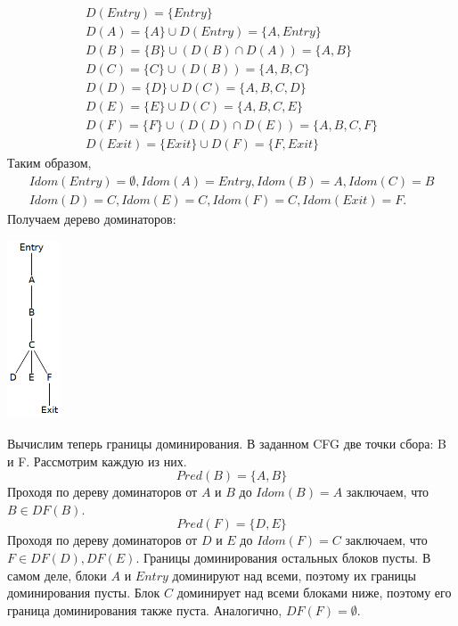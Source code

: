 \documentclass[11pt]{article}
\begin{document}
\begin{gather*}
D(Entry) = \{Entry\} \\
D(A) = \{A\} \cup D(Entry) = \{A, Entry\} \\
D(B) = \{B\} \cup (D(B) \cap D(A)) = \{A, B\} \\
D(C) = \{C\} \cup (D(B)) = \{A, B, C\} \\
D(D) = \{D\} \cup D(C) = \{A, B, C, D\} \\
D(E) = \{E\} \cup D(C) = \{A, B, C, E\} \\
D(F) = \{F\} \cup (D(D) \cap D(E)) = \{A, B, C, F\} \\
D(Exit) = \{Exit\} \cup D(F) = \{F, Exit\}
\end{gather*}
Таким образом,
\begin{gather*}
Idom(Entry) = \emptyset, Idom(A) = Entry, Idom(B) = A, Idom(C) = B \\
Idom(D) = C, Idom(E) = C, Idom(F) = C, Idom(Exit) = F.
\end{gather*}
Получаем дерево доминаторов:
\begin{center}
\includegraphics[height=200px]{dom-tree2.png}
\end{center}

Вычислим теперь границы доминирования. В заданном CFG две точки сбора: B и F. Рассмотрим
каждую из них.
\begin{equation*}
Pred(B) = \{A, B\}
\end{equation*}
Проходя по дереву доминаторов от $A$ и $B$ до $Idom(B) = A$ заключаем, что $B \in DF(B)$.
\begin{equation*}
Pred(F) = \{D, E\}
\end{equation*}
Проходя по дереву доминаторов от $D$ и $E$ до $Idom(F) = C$ заключаем, что $F \in DF(D), DF(E)$.
Границы доминирования остальных блоков пусты. В самом деле, блоки $A$ и $Entry$ доминируют над
всеми, поэтому их границы доминирования пусты. Блок $C$ доминирует над всеми блоками ниже, поэтому
его граница доминирования также пуста. Аналогично, $DF(F) = \emptyset$.
\end{document}
